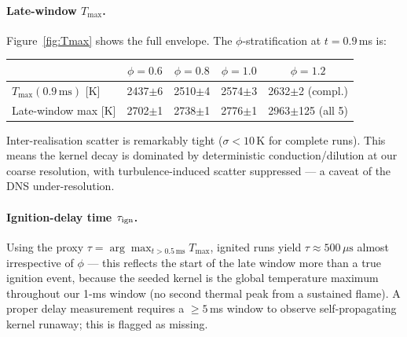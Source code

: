 \documentclass[11pt]{article}
\begin{document}
\paragraph{Late-window \(T_{\max}\).}
Figure~\ref{fig:Tmax} shows the full envelope.  The \(\phi\)-stratification
at \(t=0.9\)\,ms is:
\begin{center}
\begin{tabular}{lcccc}
\toprule
 & \(\phi\!=\!0.6\) & \(\phi\!=\!0.8\) & \(\phi\!=\!1.0\) & \(\phi\!=\!1.2\) \\
\midrule
\(T_{\max}(0.9\,\mathrm{ms})\) [K] & 2437\(\pm\)6 & 2510\(\pm\)4 & 2574\(\pm\)3 & 2632\(\pm\)2 (compl.) \\
Late-window max [K] & 2702\(\pm\)1 & 2738\(\pm\)1 & 2776\(\pm\)1 & 2963\(\pm\)125 (all 5) \\
\bottomrule
\end{tabular}
\end{center}
Inter-realisation scatter is remarkably tight (\(\sigma\!<\!10\)\,K for
complete runs).  This means the kernel decay is dominated by deterministic
conduction/dilution at our coarse resolution, with turbulence-induced scatter
suppressed --- a caveat of the DNS under-resolution.

\paragraph{Ignition-delay time \(\tau_{\rm ign}\).}
Using the proxy \(\tau=\arg\max_{t>0.5\,\mathrm{ms}}T_{\max}\), ignited runs
yield \(\tau\approx 500\,\mu\mathrm{s}\) almost irrespective of \(\phi\) ---
this reflects the start of the late window more than a true ignition event,
because the seeded kernel is the global temperature maximum throughout our
1-ms window (no second thermal peak from a sustained flame).  A proper delay
measurement requires a \(\ge\!5\)\,ms window to observe self-propagating
kernel runaway; this is flagged as missing.
\end{document}
